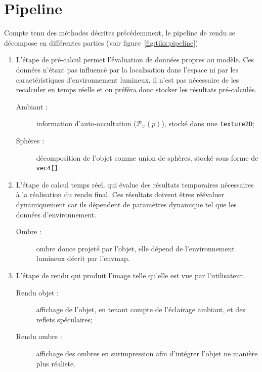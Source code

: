 \documentclass[10pt,a4paper,twoside, twocolumn]{report}
\newcommand*{\rootPath}{../}
\begin{document}
\section{Pipeline}

\begin{figure*}[ht!]
	\centering
	
	\caption{Pipeline développé}
	\label{fig:tikz:pipeline}
\end{figure*}

Compte tenu des méthodes décrites précédemment, le pipeline de rendu se décompose en différentes parties (voir figure~\ref{fig:tikz:pipeline})
\begin{enumerate}
	\item L'étape de pré-calcul permet l'évaluation de données propres au modèle. Ces données n'étant pas influencé par la localisation dans l'espace ni par les caractéristiques d'environnement lumineux, il n'est pas nécessaire de les recalculer en temps réelle et on préféra donc stocker les résultats pré-calculés.
		\begin{description}
			\item[Ambiant :] information d'auto-occultation ($\mathcal P_{\mathcal V}(p)$), stocké dans une \texttt{texture2D};
			\item[Sphères :] décomposition de l'objet comme union de sphères, stocké sous forme de \texttt{vec4[]}.
		\end{description}

	\item L'étape de calcul temps réel, qui évalue des résultats temporaires nécessaires à la réalisation du rendu final. Ces résultats doivent êtres réévaluer dynamiquement car ils dépendent de paramètres dynamique tel que les données d'environnement.
		\begin{description}
			\item[Ombre :] ombre douce projeté par l'objet, elle dépend de l'environnement lumineux décrit par l'envmap.
		\end{description}
	
	\item L'étape de rendu qui produit l'image telle qu'elle est vue par l'utilisateur.
		\begin{description}
			\item[Rendu objet :] affichage de l'objet, en tenant compte de l'éclairage ambiant, et des reflets spéculaires;
			\item[Rendu ombre :] affichage des ombres en surimpression afin d'intégrer l'objet ne manière plus réaliste.
		\end{description}
\end{enumerate}
\end{document}
